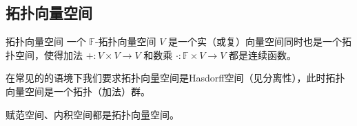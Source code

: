 

\subsection{拓扑向量空间}

\begin{definition}{拓扑向量空间}
一个 $\mathbb{F}$-拓扑向量空间 $V$ 是一个实（或复）向量空间同时也是一个拓扑空间，使得加法 $+: V \times V \to V$ 和数乘 $\cdot: \mathbb{F} \times V \to V$ 都是连续函数。

在常见的的语境下我们要求拓扑向量空间是Hasdorff空间（见分离性），此时拓扑向量空间是一个拓扑（加法）群。
\end{definition}

\begin{example}{}
赋范空间、内积空间都是拓扑向量空间。
\end{example}

